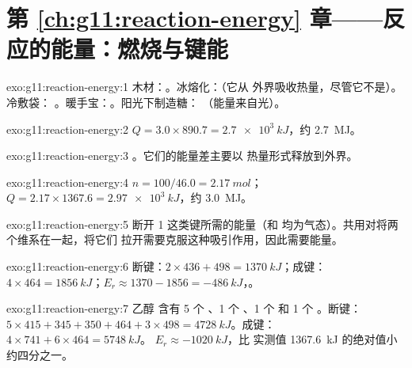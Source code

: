 \section*{第 \ref{ch:g11:reaction-energy} 章——反应的能量：燃烧与键能}

\begin{solution}{exo:g11:reaction-energy:1}
木材：。冰熔化：（它从
外界吸收热量，尽管它不是）。冷敷袋：
。暖手宝：。阳光下制造糖：
（能量来自光）。
\end{solution}

\begin{solution}{exo:g11:reaction-energy:2}
$Q = 3.0 \times 890.7 = \qty{2.7e3}{kJ}$，约 \qty{2.7}{MJ}。
\end{solution}

\begin{solution}{exo:g11:reaction-energy:3}
。它们的能量差主要以
热量形式释放到外界。
\end{solution}

\begin{solution}{exo:g11:reaction-energy:4}
$n = 100 / 46.0 = \qty{2.17}{mol}$；$Q = 2.17 \times 1367.6 =
\qty{2.97e3}{kJ}$，约 \qty{3.0}{MJ}。
\end{solution}

\begin{solution}{exo:g11:reaction-energy:5}
断开 1 这类键所需的能量（和
均为气态）。共用对将两个维系在一起，将它们
拉开需要克服这种吸引作用，因此需要能量。
\end{solution}

\begin{solution}{exo:g11:reaction-energy:6}
断键：$2 \times 436 + 498 = \qty{1370}{kJ}$；成键：
$4 \times 464 = \qty{1856}{kJ}$；$E_r \approx 1370 - 1856 =
\qty{-486}{kJ}$，。
\end{solution}

\begin{solution}{exo:g11:reaction-energy:7}
乙醇  含有 5 个 、1 个 、1 个  和 1
个 。断键：$5 \times 415 + 345 + 350 + 464 + 3 \times 498 =
\qty{4728}{kJ}$。成键：$4 \times 741 + 6 \times 464 = \qty{5748}{kJ}$。
$E_r \approx \qty{-1020}{kJ}$，比
实测值 \qty{1367.6}{kJ} 的绝对值小约四分之一。
\end{solution}

